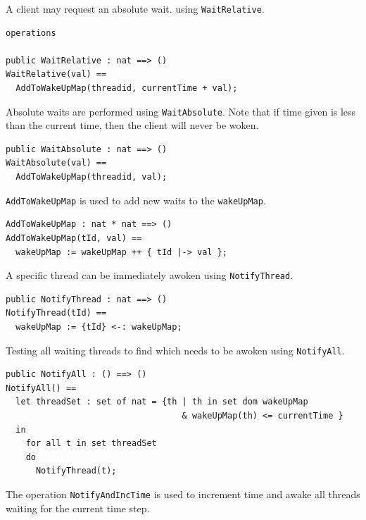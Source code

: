 \documentclass{overturerepchap}
\begin{document}
A client may request an absolute wait. using \texttt{WaitRelative}.

\begin{lstlisting}
operations

public WaitRelative : nat ==> ()
WaitRelative(val) ==
  AddToWakeUpMap(threadid, currentTime + val);
\end{lstlisting}

Absolute waits are performed using \texttt{WaitAbsolute}. Note that if time
given is less than the current time, then the client will never be
woken.

\begin{lstlisting}
public WaitAbsolute : nat ==> ()
WaitAbsolute(val) ==
  AddToWakeUpMap(threadid, val);
\end{lstlisting}

\texttt{AddToWakeUpMap} is used to add new waits to the \texttt{wakeUpMap}.

\begin{lstlisting}
AddToWakeUpMap : nat * nat ==> ()
AddToWakeUpMap(tId, val) ==
  wakeUpMap := wakeUpMap ++ { tId |-> val };
\end{lstlisting}

A specific thread can be immediately awoken
using \texttt{NotifyThread}.

\begin{lstlisting}
public NotifyThread : nat ==> ()
NotifyThread(tId) ==
  wakeUpMap := {tId} <-: wakeUpMap;
\end{lstlisting}

%

Testing all waiting threads to find which needs to be awoken using \texttt{NotifyAll}.

\begin{lstlisting}
public NotifyAll : () ==> ()
NotifyAll() ==
  let threadSet : set of nat = {th | th in set dom wakeUpMap 
                                   & wakeUpMap(th) <= currentTime }
  in
    for all t in set threadSet 
    do
      NotifyThread(t);
\end{lstlisting}

The operation \texttt{NotifyAndIncTime} is used to increment time and
awake all threads waiting for the current time step.
\end{document}
